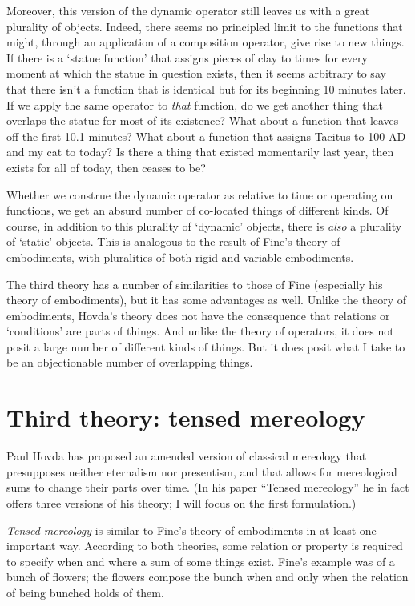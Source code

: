 \documentclass[11pt]{article}
\begin{document}
\begin{spacing}{1.5}
Moreover, this version of the dynamic operator still leaves us with a
great plurality of objects.  Indeed, there seems no principled limit
to the functions that might, through an application of a composition
operator, give rise to new things.  If there is a `statue function'
that assigns pieces of clay to times for every moment at which the
statue in question exists, then it seems arbitrary to say that there
isn't a function that is identical but for its beginning 10 minutes
later.  If we apply the same operator to {\em that} function, do we
get another thing that overlaps the statue for most of its existence?
What about a function that leaves off the first 10.1 minutes?  What
about a function that assigns Tacitus to 100 AD and my cat to today?
Is there a thing that existed momentarily last year, then exists for
all of today, then ceases to be?

Whether we construe the dynamic operator as relative to time or
operating on functions, we get an absurd number of co-located things
of different kinds.  Of course, in addition to this plurality of
`dynamic' objects, there is {\em also} a plurality of `static'
objects.  This is analogous to the result of Fine's theory of
embodiments, with pluralities of both rigid and variable embodiments.

The third theory has a number of similarities to those of Fine
(especially his theory of embodiments), but it has some advantages as
well.  Unlike the theory of embodiments, Hovda's theory does not have
the consequence that relations or `conditions' are parts of things.
And unlike the theory of operators, it does not posit a large number
of different kinds of things.  But it does posit what I take to be an
objectionable number of overlapping things.

\section{Third theory: tensed mereology}
\label{hovda}
Paul Hovda has proposed an amended version of classical mereology that
presupposes neither eternalism nor presentism, and that allows for
mereological sums to change their parts over time.  (In his paper
``Tensed mereology'' \citeyearpar{hovda2011} he in fact offers three
versions of his theory; I will focus on the first formulation.)

{\em Tensed mereology} is similar to Fine's theory of embodiments in
at least one important way.  According to both theories, some relation
or property is required to specify when and where a sum of some things
exist.  Fine's example was of a bunch of flowers; the flowers compose
the bunch when and only when the relation of being bunched holds of
them.


\end{spacing}
\end{document}
